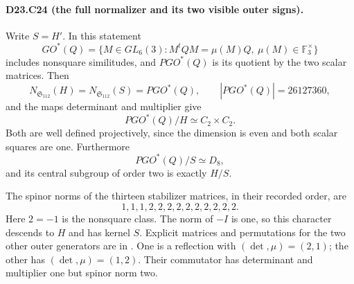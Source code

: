 \paragraph{D23.C24 (the full normalizer and its two visible outer signs).}
Write $S=H'$. In this statement
\[
 GO^*(Q)=\{M\in GL_6(3):M^tQM=\mu(M)Q,
                                 \ \mu(M)\in\mathbb F_3^\times\}
\]
includes nonsquare similitudes, and $PGO^*(Q)$ is its quotient
by the two scalar matrices. Then
\[
 N_{\mathfrak S_{112}}(H)=N_{\mathfrak S_{112}}(S)
       =PGO^*(Q),\qquad |PGO^*(Q)|=26127360,
\tag{D23.C24.1}
\]
and the maps determinant and multiplier give
\[
 PGO^*(Q)/H\simeq C_2\times C_2.
\tag{D23.C24.2}
\]
Both are well defined projectively, since the dimension is
even and both scalar squares are one. Furthermore
\[
                   PGO^*(Q)/S\simeq D_8,
\]
and its central subgroup of order two is exactly $H/S$.

The spinor norms of the thirteen stabilizer matrices, in
their recorded order, are
\[
                       1,1,1,2,2,2,2,2,2,2,2,2,2.
\tag{D23.C24.3}
\]
Here $2=-1$ is the nonsquare class. The norm of $-I$ is one,
so this character descends to $H$ and has kernel $S$.
Explicit matrices and permutations for the two other outer
generators are in
.
One is a reflection with $(\det,\mu)=(2,1)$; the other has
$(\det,\mu)=(1,2)$. Their commutator has determinant and
multiplier one but spinor norm two.

